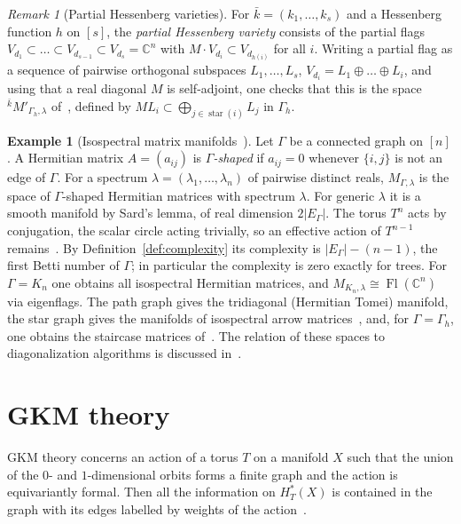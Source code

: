 \documentclass[11pt,a4paper]{article}
\numberwithin{equation}{section}
\theoremstyle{plain}
\theoremstyle{definition}
\newtheorem{example}[theorem]{Example}
\theoremstyle{remark}
\newtheorem{remark}[theorem]{Remark}
\newcommand{\C}{\mathbb{C}}
\newcommand{\HT}{H^{*}_{T}}
\DeclareMathOperator{\Fl}{Fl}
\begin{document}
\begin{remark}[Partial Hessenberg varieties]\label{rem:partial-hess}
For $\bar k=(k_1,\dots,k_s)$ and a Hessenberg function $h$ on $[s]$, the \emph{partial Hessenberg variety} consists of the partial flags $V_{d_1}\subset\dots\subset V_{d_{s-1}}\subset V_{d_s}=\C^n$ with $M\cdot V_{d_i}\subset V_{d_{h(i)}}$ for all $i$. Writing a partial flag as a sequence of pairwise orthogonal subspaces $L_1,\dots,L_s$, $V_{d_i}=L_1\oplus\dots\oplus L_i$, and using that a real diagonal $M$ is self-adjoint, one checks that this is the space ${}^{\bar k}M'_{\Gamma_h,\lambda}$ of~\cite[§5.2]{AB24}, defined by $M L_i\subset\bigoplus_{j\in\operatorname{star}(i)}L_j$ in $\Gamma_h$.
\end{remark}

\begin{example}[Isospectral matrix manifolds~\cite{AB24}]\label{ex:isospectral}
Let $\Gamma$ be a connected graph on $[n]$. A Hermitian matrix $A=(a_{ij})$ is \emph{$\Gamma$-shaped} if $a_{ij}=0$ whenever $\{i,j\}$ is not an edge of $\Gamma$. For a spectrum $\lambda=(\lambda_1,\dots,\lambda_n)$ of pairwise distinct reals, $M_{\Gamma,\lambda}$ is the space of $\Gamma$-shaped Hermitian matrices with spectrum $\lambda$. For generic $\lambda$ it is a smooth manifold by Sard's lemma, of real dimension $2|E_\Gamma|$. The torus $T^n$ acts by conjugation, the scalar circle acting trivially, so an effective action of $T^{n-1}$ remains~\cite{AB24}. By Definition~\ref{def:complexity} its complexity is $|E_\Gamma|-(n-1)$, the first Betti number of $\Gamma$; in particular the complexity is zero exactly for trees. For $\Gamma=K_n$ one obtains all isospectral Hermitian matrices, and $M_{K_n,\lambda}\cong\Fl(\C^n)$ via eigenflags. The path graph gives the tridiagonal (Hermitian Tomei) manifold, the star graph gives the manifolds of isospectral arrow matrices~\cite{AB21a}, and, for $\Gamma=\Gamma_h$, one obtains the staircase matrices of~\cite{AB21}. The relation of these spaces to diagonalization algorithms is discussed in~\cite{AS22}.
\end{example}

\section{GKM theory}\label{sec:GKM}

GKM theory concerns an action of a torus $T$ on a manifold $X$ such that the union of the $0$- and $1$-dimensional orbits forms a finite graph and the action is equivariantly formal. Then all the information on $\HT(X)$ is contained in the graph with its edges labelled by weights of the action~\cite{GKM98}.
\end{document}
